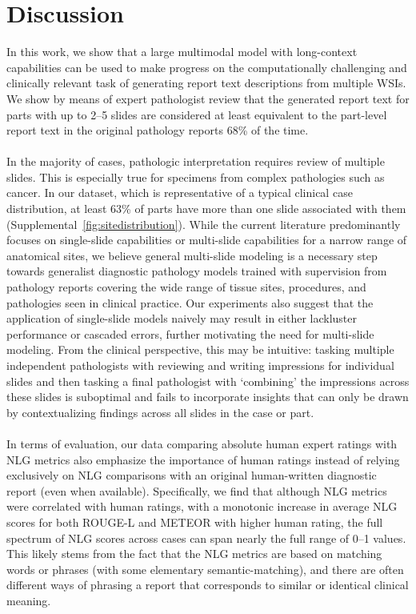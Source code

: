 \documentclass[11pt]{article}
\begin{document}
\section{Discussion}
\label{sec:discussion}
In this work, we show that a large multimodal model with long-context capabilities can be used to make progress on the computationally challenging and clinically relevant task of generating report text descriptions from multiple WSIs. We show by means of expert pathologist review that the generated report text for parts with up to 2--5 slides are considered at least equivalent to the part-level report text in the original pathology reports 68\% of the time. \\ \\
In the majority of cases, pathologic interpretation requires review of multiple slides. This is especially true for specimens from complex pathologies such as cancer. In our dataset, which is representative of a typical clinical case distribution, at least 63\% of parts have more than one slide associated with them (Supplemental~\autoref{fig:sitedistribution}). While the current literature predominantly focuses on single-slide capabilities or multi-slide capabilities for a narrow range of anatomical sites, we believe general multi-slide modeling is a necessary step towards generalist diagnostic pathology models trained with supervision from pathology reports covering the wide range of tissue sites, procedures, and pathologies seen in clinical practice. Our experiments also suggest that the application of single-slide models naively may result in either lackluster performance or cascaded errors, further motivating the need for multi-slide modeling. From the clinical perspective, this may be intuitive: tasking multiple independent pathologists with reviewing and writing impressions for individual slides and then tasking a final pathologist with `combining' the impressions across these slides is suboptimal and fails to incorporate insights that can only be drawn by contextualizing findings across all slides in the case or part. \\ \\
In terms of evaluation, our data comparing absolute human expert ratings with NLG metrics also emphasize the importance of human ratings instead of relying exclusively on NLG comparisons with an original human-written diagnostic report (even when available). Specifically, we find that although NLG metrics were correlated with human ratings, with a monotonic increase in average NLG scores for both ROUGE-L and METEOR with higher human rating, the full spectrum of NLG scores across cases can span nearly the full range of 0--1 values. This likely stems from the fact that the NLG metrics are based on matching words or phrases (with some elementary semantic-matching), and there are often different ways of phrasing a report that corresponds to similar or identical clinical meaning. \\ \\
\end{document}
